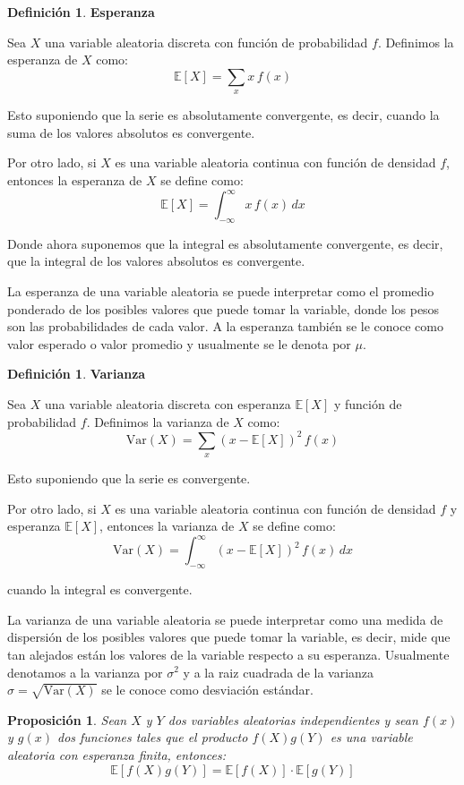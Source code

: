 \documentclass[
 12pt,
 letterpaper,
]{article}
\theoremstyle{teoremaBreak}
\theoremstyle{plain}
\newtheorem{proposicion}[teorema]{Proposición}
\theoremstyle{definition}
\newtheorem{definicion}[teorema]{Definición}
\begin{document}
\begin{definicion}
\textbf{Esperanza}

Sea $X$ una variable aleatoria discreta con función de probabilidad $f$. Definimos la esperanza de $X$ como:
$$\mathbb{E}[X] = \sum_{x} x\,f(x)$$

Esto suponiendo que la serie es absolutamente convergente, es decir, cuando la suma de los valores absolutos 
es convergente.

Por otro lado, si $X$ es una variable aleatoria continua con función de densidad $f$, entonces la esperanza de $X$ se define como:
$$\mathbb{E}[X] = \int_{-\infty}^{\infty} x\,f(x)\,dx$$

Donde ahora suponemos que la integral es absolutamente convergente, es decir, que la integral de los 
valores absolutos es convergente.

La esperanza de una variable aleatoria se puede interpretar como el promedio ponderado de los posibles 
valores que puede tomar la variable, donde los pesos son las probabilidades de cada valor. A la esperanza 
también se le conoce como valor esperado o valor promedio y usualmente se le denota por $\mu$.
\end{definicion}

\begin{definicion}
\textbf{Varianza}

Sea $X$ una variable aleatoria discreta con esperanza $\mathbb{E}[X]$ y función de probabilidad $f$. 
Definimos la varianza de $X$ como:
$$\text{Var}(X) = \sum_{x} (x - \mathbb{E}[X])^2\,f(x)$$

Esto suponiendo que la serie es convergente.

Por otro lado, si $X$ es una variable aleatoria continua con función de densidad $f$ y esperanza 
$\mathbb{E}[X]$, entonces la varianza de $X$ se define como:
$$\text{Var}(X) = \int_{-\infty}^{\infty} (x - \mathbb{E}[X])^2\,f(x)\,dx$$

cuando la integral es convergente.

La varianza de una variable aleatoria se puede interpretar como una medida de dispersión de los posibles 
valores que puede tomar la variable, es decir, mide que tan alejados están los valores de la variable respecto 
a su esperanza. Usualmente denotamos a la varianza por $\sigma^2$ y a la raiz cuadrada de la varianza 
$ \sigma = \sqrt{\text{Var}(X)}$ se le conoce como desviación estándar.
\end{definicion}

\begin{proposicion}
Sean $X$ y $Y$ dos variables aleatorias independientes y sean $f(x)$ y $g(x)$ dos funciones tales que el 
producto $f(X)g(Y)$ es una variable aleatoria con esperanza finita, entonces:
$$\mathbb{E}[f(X)g(Y)] = \mathbb{E}[f(X)] \cdot \mathbb{E}[g(Y)]$$ 
\end{proposicion}
\end{document}

